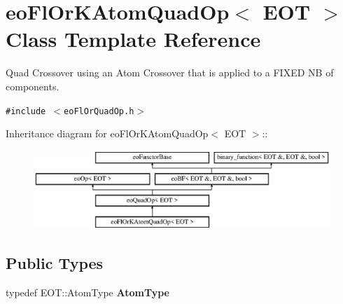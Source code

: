 \section{eo\-Fl\-Or\-KAtom\-Quad\-Op$<$ EOT $>$ Class Template Reference}
\label{classeo_fl_or_k_atom_quad_op}
Quad Crossover using an Atom Crossover that is applied to a FIXED NB of components.  


{\tt \#include $<$eo\-Fl\-Or\-Quad\-Op.h$>$}

Inheritance diagram for eo\-Fl\-Or\-KAtom\-Quad\-Op$<$ EOT $>$::\begin{figure}[H]
\begin{center}
\leavevmode
\includegraphics[height=2.96296cm]{classeo_fl_or_k_atom_quad_op}
\end{center}
\end{figure}
\subsection*{Public Types}
\begin{CompactItemize}
\item 
typedef EOT::Atom\-Type {\bf Atom\-Type}\label{classeo_fl_or_k_atom_quad_op_w0}

\end{CompactItemize}
